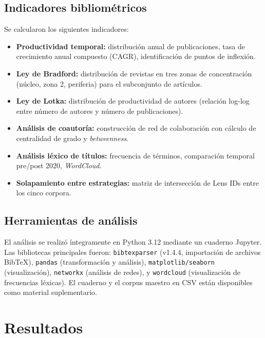 \documentclass[12pt, a4paper]{article}
\begin{document}
\subsection{Indicadores bibliométricos}

Se calcularon los siguientes indicadores:

\begin{itemize}[leftmargin=*, itemsep=2pt]
    \item \textbf{Productividad temporal:} distribución anual de publicaciones,
    tasa de crecimiento anual compuesto (CAGR), identificación de puntos de inflexión.
    \item \textbf{Ley de Bradford:} distribución de revistas en tres zonas de
    concentración (núcleo, zona 2, periferia) para el subconjunto de artículos.
    \item \textbf{Ley de Lotka:} distribución de productividad de autores
    (relación log-log entre número de autores y número de publicaciones).
    \item \textbf{Análisis de coautoría:} construcción de red de colaboración
    con cálculo de centralidad de grado y \textit{betweenness}.
    \item \textbf{Análisis léxico de títulos:} frecuencia de términos, comparación
    temporal pre/post 2020, \textit{WordCloud}.
    \item \textbf{Solapamiento entre estrategias:} matriz de intersección de
    Lens IDs entre los cinco corpora.
\end{itemize}

\subsection{Herramientas de análisis}

El análisis se realizó íntegramente en Python 3.12 mediante un cuaderno
Jupyter. Las bibliotecas principales fueron: \texttt{bibtexparser} (v1.4.4,
importación de archivos BibTeX), \texttt{pandas} (transformación y análisis),
\texttt{matplotlib/seaborn} (visualización), \texttt{networkx} (análisis de redes),
y \texttt{wordcloud} (visualización de frecuencias léxicas). El cuaderno y el
corpus maestro en CSV están disponibles como material suplementario.

\section{Resultados}
\label{sec:resultados}
\end{document}
